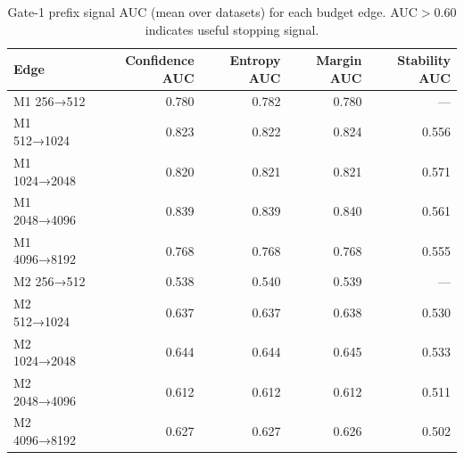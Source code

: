 \begin{table}[ht]
\centering
\small
\begin{tabular}{lrrrr}
\toprule
Edge & Confidence AUC & Entropy AUC & Margin AUC & Stability AUC \\
\midrule
M1 256→512 & 0.780 & 0.782 & 0.780 & — \\
M1 512→1024 & 0.823 & 0.822 & 0.824 & 0.556 \\
M1 1024→2048 & 0.820 & 0.821 & 0.821 & 0.571 \\
M1 2048→4096 & 0.839 & 0.839 & 0.840 & 0.561 \\
M1 4096→8192 & 0.768 & 0.768 & 0.768 & 0.555 \\
M2 256→512 & 0.538 & 0.540 & 0.539 & — \\
M2 512→1024 & 0.637 & 0.637 & 0.638 & 0.530 \\
M2 1024→2048 & 0.644 & 0.644 & 0.645 & 0.533 \\
M2 2048→4096 & 0.612 & 0.612 & 0.612 & 0.511 \\
M2 4096→8192 & 0.627 & 0.627 & 0.626 & 0.502 \\
\bottomrule
\end{tabular}
\caption{Gate-1 prefix signal AUC (mean over datasets) for each budget edge. AUC$>0.60$ indicates useful stopping signal.}
\label{tab:a06_signal_heatmap}
\end{table}